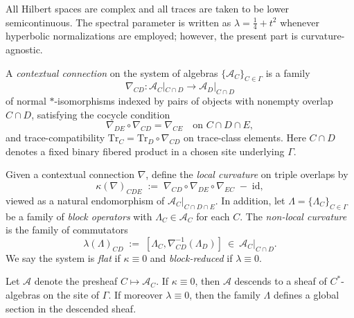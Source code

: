 \begin{remark}[Normalizations]\label{rem:normalizations}
All Hilbert spaces are complex and all traces are taken to be lower semicontinuous. The spectral parameter is written as $\lambda=\frac14+t^2$ whenever hyperbolic normalizations are employed; however, the present part is curvature-agnostic. \relax
\end{remark}


\begin{definition}\label{def:connection}
A \emph{contextual connection} on the system of algebras $\{\mathcal A_C\}_{C\in\Gamma}$ is a family
\[
\nabla_{CD}:\mathcal A_C|_{C\cap D}\longrightarrow \mathcal A_D|_{C\cap D}
\]
of normal $\ast$-isomorphisms indexed by pairs of objects with nonempty overlap $C\cap D$, satisfying the cocycle condition
\[
\nabla_{DE}\circ \nabla_{CD}=\nabla_{CE}\quad\text{on }C\cap D\cap E,
\]
and trace-compatibility $\mathrm{Tr}_C=\mathrm{Tr}_D\circ \nabla_{CD}$ on trace-class elements. Here $C\cap D$ denotes a fixed binary fibered product in a chosen site underlying $\Gamma$.
\end{definition}

\begin{definition}\label{def:curvatures}
Given a contextual connection $\nabla$, define the \emph{local curvature} on triple overlaps by
\[
\kappa(\nabla)_{CDE}\;:=\;\nabla_{CD}\circ \nabla_{DE}\circ \nabla_{EC}\;-\;\mathrm{id},
\]
viewed as a natural endomorphism of $\mathcal A_C|_{C\cap D\cap E}$. In addition, let $\Lambda=\{\Lambda_C\}_{C\in\Gamma}$ be a family of \emph{block operators} with $\Lambda_C\in \mathcal A_C$ for each $C$. The \emph{non-local curvature} is the family of commutators
\[
\lambda(\Lambda)_{CD}\;:=\;[\Lambda_C,\nabla_{CD}^{-1}(\Lambda_D)]\ \in \ \mathcal A_C|_{C\cap D}.
\]
We say the system is \emph{flat} if $\kappa\equiv 0$ and \emph{block-reduced} if $\lambda\equiv 0$.
\end{definition}

\begin{lemma}\label{lem:sheaf-compat}
Let $\mathscr A$ denote the presheaf $C\mapsto \mathcal A_C$. If $\kappa\equiv 0$, then $\mathscr A$ descends to a sheaf of $C^\ast$-algebras on the site of $\Gamma$. If moreover $\lambda\equiv 0$, then the family $\Lambda$ defines a global section in the descended sheaf.
\end{lemma}

